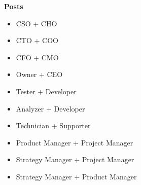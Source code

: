 \documentclass[11pt,a4paper]{article}
\begin{document}
\textbf{Posts}\\[-7.5mm]
\begin{itemize}
    \item CSO + CHO\\[-7.5mm]
    \item CTO + COO\\[-7.5mm]
    \item CFO + CMO\\[-7.5mm]
    \item Owner + CEO\\[-7.5mm]
    \item Tester + Developer\\[-7.5mm]
    \item Analyzer + Developer\\[-7.5mm]
    \item Technician + Supporter\\[-7.5mm]
    \item Product Manager + Project Manager\\[-7.5mm]
    \item Strategy Manager + Project Manager\\[-7.5mm]
    \item Strategy Manager + Product Manager
\end{itemize}
\end{document}
